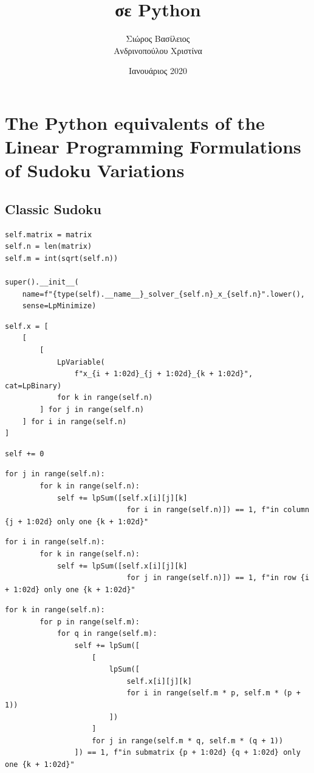 \documentclass[12pt]{article}
\title{\hugeΥλοποίηση σε Python}
\author{Σιώρος Βασίλειος\\Ανδρινοπούλου Χριστίνα}
\date{Ιανουάριος 2020}
\begin{document}
\maketitle


\pagebreak

\section{The Python equivalents of the Linear Programming Formulations of Sudoku Variations}

\subsection{Classic Sudoku}

\begin{lstlisting}[caption={TODO}]
self.matrix = matrix
self.n = len(matrix)
self.m = int(sqrt(self.n))

super().__init__(
    name=f"{type(self).__name__}_solver_{self.n}_x_{self.n}".lower(),
    sense=LpMinimize)
\end{lstlisting}

\begin{lstlisting}[caption={TODO}]
self.x = [
    [
        [
            LpVariable(
                f"x_{i + 1:02d}_{j + 1:02d}_{k + 1:02d}", cat=LpBinary)
            for k in range(self.n)
        ] for j in range(self.n)
    ] for i in range(self.n)
]
\end{lstlisting}

\begin{lstlisting}[caption={TODO}]
self += 0
\end{lstlisting}

\begin{lstlisting}[caption={TODO}]
    for j in range(self.n):
        for k in range(self.n):
            self += lpSum([self.x[i][j][k]
                            for i in range(self.n)]) == 1, f"in column {j + 1:02d} only one {k + 1:02d}"
\end{lstlisting}

\begin{lstlisting}[caption={TODO}]
    for i in range(self.n):
        for k in range(self.n):
            self += lpSum([self.x[i][j][k]
                            for j in range(self.n)]) == 1, f"in row {i + 1:02d} only one {k + 1:02d}"
\end{lstlisting}

\begin{lstlisting}[caption={TODO}]
    for k in range(self.n):
        for p in range(self.m):
            for q in range(self.m):
                self += lpSum([
                    [
                        lpSum([
                            self.x[i][j][k]
                            for i in range(self.m * p, self.m * (p + 1))
                        ])
                    ]
                    for j in range(self.m * q, self.m * (q + 1))
                ]) == 1, f"in submatrix {p + 1:02d} {q + 1:02d} only one {k + 1:02d}"
\end{lstlisting}
\end{document}
